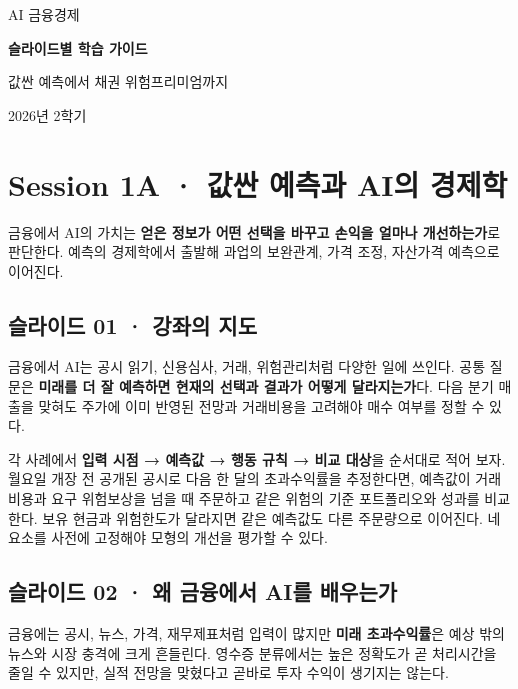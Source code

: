 \documentclass[11pt,a4paper]{article}
\begin{document}
\begin{titlepage}
\centering
\vspace*{3cm}
{\Large AI 금융경제\par}
\vspace{1.2cm}
{\Huge\bfseries 슬라이드별 학습 가이드\par}
\vspace{1.2cm}
{\large 값싼 예측에서 채권 위험프리미엄까지\par}
\vfill
{\large 2026년 2학기\par}
\end{titlepage}
\tableofcontents
\clearpage

\section{Session 1A · 값싼 예측과 AI의 경제학}
금융에서 AI의 가치는 \textbf{얻은 정보가 어떤 선택을 바꾸고 손익을 얼마나 개선하는가}로 판단한다. 예측의 경제학에서 출발해 과업의 보완관계, 가격 조정, 자산가격 예측으로 이어진다.\par

\subsection{슬라이드 01 · 강좌의 지도}
금융에서 AI는 공시 읽기, 신용심사, 거래, 위험관리처럼 다양한 일에 쓰인다. 공통 질문은 \textbf{미래를 더 잘 예측하면 현재의 선택과 결과가 어떻게 달라지는가}다. 다음 분기 매출을 맞혀도 주가에 이미 반영된 전망과 거래비용을 고려해야 매수 여부를 정할 수 있다.\par

각 사례에서 \textbf{입력 시점 → 예측값 → 행동 규칙 → 비교 대상}을 순서대로 적어 보자. 월요일 개장 전 공개된 공시로 다음 한 달의 초과수익률을 추정한다면, 예측값이 거래비용과 요구 위험보상을 넘을 때 주문하고 같은 위험의 기준 포트폴리오와 성과를 비교한다. 보유 현금과 위험한도가 달라지면 같은 예측값도 다른 주문량으로 이어진다. 네 요소를 사전에 고정해야 모형의 개선을 평가할 수 있다.\par

\subsection{슬라이드 02 · 왜 금융에서 AI를 배우는가}
금융에는 공시, 뉴스, 가격, 재무제표처럼 입력이 많지만 \textbf{미래 초과수익률}은 예상 밖의 뉴스와 시장 충격에 크게 흔들린다. 영수증 분류에서는 높은 정확도가 곧 처리시간을 줄일 수 있지만, 실적 전망을 맞혔다고 곧바로 투자 수익이 생기지는 않는다.\par
\end{document}
